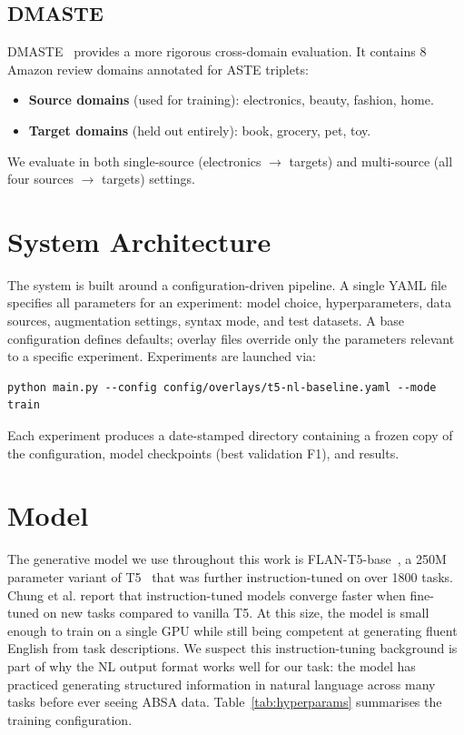 \documentclass[12pt,a4paper]{report}
\begin{document}
\subsection{DMASTE}

DMASTE~\cite{xu2023dmaste} provides a more rigorous cross-domain evaluation. It contains 8 Amazon review domains annotated for ASTE triplets:

\begin{itemize}
    \item \textbf{Source domains} (used for training): electronics, beauty, fashion, home.
    \item \textbf{Target domains} (held out entirely): book, grocery, pet, toy.
\end{itemize}

We evaluate in both single-source (electronics $\rightarrow$ targets) and multi-source (all four sources $\rightarrow$ targets) settings.


\section{System Architecture}

The system is built around a configuration-driven pipeline. A single YAML file specifies all parameters for an experiment: model choice, hyperparameters, data sources, augmentation settings, syntax mode, and test datasets. A base configuration defines defaults; overlay files override only the parameters relevant to a specific experiment. Experiments are launched via:

\begin{lstlisting}
python main.py --config config/overlays/t5-nl-baseline.yaml --mode train
\end{lstlisting}

Each experiment produces a date-stamped directory containing a frozen copy of the configuration, model checkpoints (best validation F1), and results.


\section{Model}

The generative model we use throughout this work is FLAN-T5-base~\cite{chung2022scaling}, a 250M parameter variant of T5~\cite{raffel2020exploring} that was further instruction-tuned on over 1800 tasks. Chung et al. report that instruction-tuned models converge faster when fine-tuned on new tasks compared to vanilla T5. At this size, the model is small enough to train on a single GPU while still being competent at generating fluent English from task descriptions. We suspect this instruction-tuning background is part of why the NL output format works well for our task: the model has practiced generating structured information in natural language across many tasks before ever seeing ABSA data. Table~\ref{tab:hyperparams} summarises the training configuration.
\end{document}
